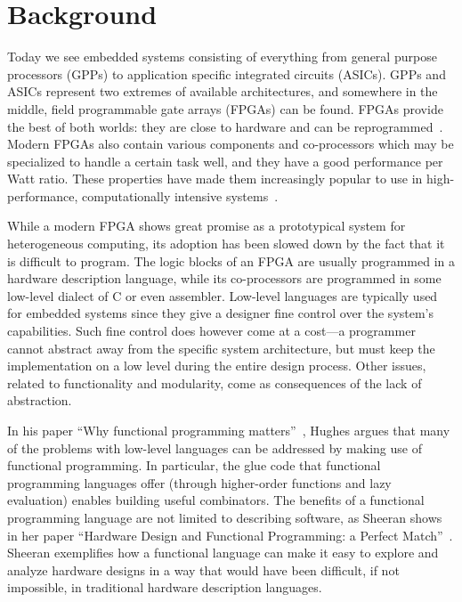 \documentclass[../paper.tex]{subfiles}
\begin{document}
\chapter{Background}
\label{background}

Today we see embedded systems consisting of everything from general purpose processors (GPPs) to application specific integrated circuits (ASICs). GPPs and ASICs represent two extremes of available architectures, and somewhere in the middle, field programmable gate arrays (FPGAs) can be found. FPGAs provide the best of both worlds: they are close to hardware and can be reprogrammed~\cite{bacon2013}. Modern FPGAs also contain various components and co-processors which may be specialized to handle a certain task well, and they have a good performance per Watt ratio. These properties have made them increasingly popular to use in high-performance, computationally intensive systems~\cite{mcmillan2014}. 

While a modern FPGA shows great promise as a prototypical system for heterogeneous computing, its adoption has been slowed down by the fact that it is difficult to program. The logic blocks of an FPGA are usually programmed in a hardware description language, while its co-processors are programmed in some low-level dialect of C or even assembler. Low-level languages are typically used for embedded systems since they give a designer fine control over the system's capabilities. Such fine control does however come at a cost---a programmer cannot abstract away from the specific system architecture, but must keep the implementation on a low level during the entire design process. Other issues, related to functionality and modularity, come as consequences of the lack of abstraction.

In his paper ``Why functional programming matters''~\cite{hughes1989}, Hughes argues that many of the problems with low-level languages can be addressed by making use of functional programming. In particular, the glue code that functional programming languages offer (through higher-order functions and lazy evaluation) enables building useful combinators. The benefits of a functional programming language are not limited to describing software, as Sheeran shows in her paper ``Hardware Design and Functional Programming: a Perfect Match''~\cite{sheeran2005}. Sheeran exemplifies how a functional language can make it easy to explore and analyze hardware designs in a way that would have been difficult, if not impossible, in traditional hardware description languages.
\end{document}
